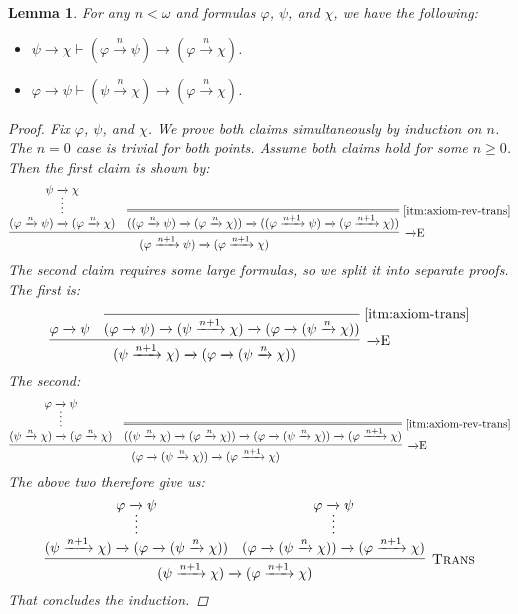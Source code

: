 \documentclass{amsart}
\newtheorem{lemma}[theorem]{Lemma}
\theoremstyle{definition}
\numberwithin{equation}{theorem}
\renewcommand{\phi}{\varphi}
\newcommand{\proves}{\vdash}
\newcommand{\narrow}[1]{\xrightarrow{#1}}
\renewcommand{\to}{\narrow{}}
\newcommand{\arr}{{\to}}
\newcommand{\elim}{\!\operatorname{E}}
\newcommand{\trans}{\text{\sc{Trans}}}
\newcommand{\aref}[1]{\!\text{\ref{itm:axiom-#1}}}
\begin{document}
\begin{lemma}\label{lem:proof-technical}
  For any $n<\omega$ and formulas $\phi$, $\psi$, and $\chi$, we have the following:
  \begin{itemize}
  \item $\psi\to\chi\proves (\phi\narrow{n}\psi)\to(\phi\narrow{n}\chi)$.
  \item $\phi\to\psi\proves (\psi\narrow{n}\chi)\to(\phi\narrow{n}\chi)$.
  \end{itemize}
  \begin{proof}
    Fix $\phi$, $\psi$, and $\chi$.
    We prove both claims simultaneously by induction on $n$.
    The $n=0$ case is trivial for both points.
    Assume both claims hold for some $n\geq 0$.
    Then the first claim is shown by:
    \[
      \infer[\arr\elim]{(\phi\narrow{n+1}\psi)\to(\phi\narrow{n+1}\chi)}{
        \infer*{(\phi\narrow{n}\psi)\to(\phi\narrow{n}\chi)}{\psi\to\chi} &
        \infer=[\aref{rev-trans}]{((\phi\narrow{n}\psi)\to(\phi\narrow{n}\chi))\to((\phi\narrow{n+1}\psi)\to(\phi\narrow{n+1}\chi))}{}
      }
    \]
    The second claim requires some large formulas, so we split it into separate proofs.
    The first is:
    \[
      \infer[\arr\elim]{(\psi\narrow{n+1}\chi)\to(\phi\to(\psi\narrow n\chi))}{
        \phi\to\psi &
        \infer[\aref{trans}]{(\phi\to\psi)\to(\psi\narrow{n+1}\chi)\to(\phi\to(\psi\narrow n\chi))}{}
      }
    \]
    The second:
    \[
      \infer[\arr\elim]{(\phi\to(\psi\narrow{n}\chi))\to(\phi\narrow{n+1}\chi)}{
        \infer*{(\psi\narrow n\chi)\to(\phi\narrow n\chi)}{\phi\to\psi} &
        \infer=[\aref{rev-trans}]{((\psi\narrow n\chi)\to(\phi\narrow n\chi))\to(\phi\to(\psi\narrow n\chi))\to(\phi\narrow{n+1}\chi)}{}
      }
    \]
    The above two therefore give us:
    \[
      \infer[\trans]{(\psi\narrow{n+1}\chi)\to(\phi\narrow{n+1}\chi)}{
        \infer*{(\psi\narrow{n+1}\chi)\to(\phi\to(\psi\narrow n\chi))}{\phi\to\psi} &
        \infer*{(\phi\to(\psi\narrow{n}\chi))\to(\phi\narrow{n+1}\chi)}{\phi\to\psi}
      }
    \]
    That concludes the induction.
  \end{proof}
\end{lemma}
\end{document}
